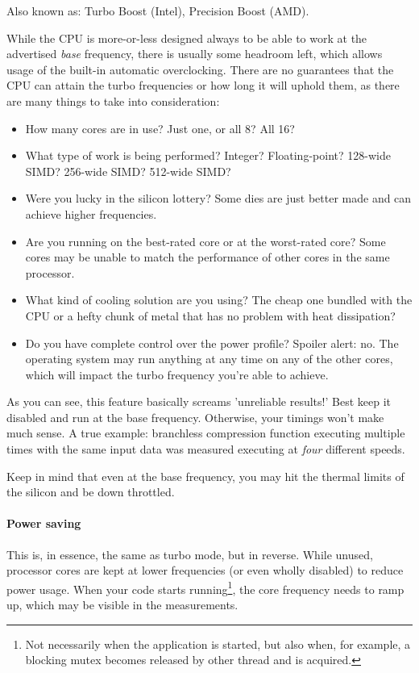 \documentclass[hidelinks,titlepage,a4paper,twoside]{article}
\begin{document}
Also known as: Turbo Boost (Intel), Precision Boost (AMD).

While the CPU is more-or-less designed always to be able to work at the advertised \emph{base} frequency, there is usually some headroom left, which allows usage of the built-in automatic overclocking. There are no guarantees that the CPU can attain the turbo frequencies or how long it will uphold them, as there are many things to take into consideration:

\begin{itemize}
\item How many cores are in use? Just one, or all 8? All 16?
\item What type of work is being performed? Integer? Floating-point? 128-wide SIMD? 256-wide SIMD? 512-wide SIMD?
\item Were you lucky in the silicon lottery? Some dies are just better made and can achieve higher frequencies.
\item Are you running on the best-rated core or at the worst-rated core? Some cores may be unable to match the performance of other cores in the same processor.
\item What kind of cooling solution are you using? The cheap one bundled with the CPU or a hefty chunk of metal that has no problem with heat dissipation?
\item Do you have complete control over the power profile? Spoiler alert: no. The operating system may run anything at any time on any of the other cores, which will impact the turbo frequency you're able to achieve.
\end{itemize}

As you can see, this feature basically screams 'unreliable results!' Best keep it disabled and run at the base frequency. Otherwise, your timings won't make much sense. A true example: branchless compression function executing multiple times with the same input data was measured executing at \emph{four} different speeds.

Keep in mind that even at the base frequency, you may hit the thermal limits of the silicon and be down throttled.

\paragraph{Power saving}

This is, in essence, the same as turbo mode, but in reverse. While unused, processor cores are kept at lower frequencies (or even wholly disabled) to reduce power usage. When your code starts running\footnote{Not necessarily when the application is started, but also when, for example, a blocking mutex becomes released by other thread and is acquired.}, the core frequency needs to ramp up, which may be visible in the measurements.
\end{document}
